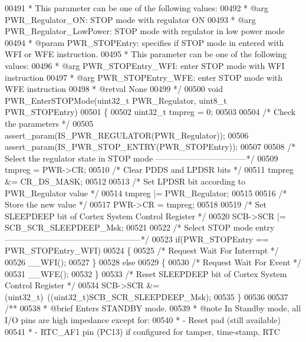 \begin{DoxyCode}
00491 \textcolor{comment}{  *          This parameter can be one of the following values:}
00492 \textcolor{comment}{  *            @arg PWR\_Regulator\_ON: STOP mode with regulator ON}
00493 \textcolor{comment}{  *            @arg PWR\_Regulator\_LowPower: STOP mode with regulator in low power mode}
00494 \textcolor{comment}{  * @param  PWR\_STOPEntry: specifies if STOP mode in entered with WFI or WFE instruction.}
00495 \textcolor{comment}{  *          This parameter can be one of the following values:}
00496 \textcolor{comment}{  *            @arg PWR\_STOPEntry\_WFI: enter STOP mode with WFI instruction}
00497 \textcolor{comment}{  *            @arg PWR\_STOPEntry\_WFE: enter STOP mode with WFE instruction}
00498 \textcolor{comment}{  * @retval None}
00499 \textcolor{comment}{  */}
00500 \textcolor{keywordtype}{void} PWR_EnterSTOPMode(uint32\_t PWR\_Regulator, uint8\_t PWR\_STOPEntry)
00501 \{
00502   uint32\_t tmpreg = 0;
00503 
00504   \textcolor{comment}{/* Check the parameters */}
00505   assert_param(IS\_PWR\_REGULATOR(PWR\_Regulator));
00506   assert_param(IS\_PWR\_STOP\_ENTRY(PWR\_STOPEntry));
00507 
00508   \textcolor{comment}{/* Select the regulator state in STOP mode ---------------------------------*/}
00509   tmpreg = PWR->CR;
00510   \textcolor{comment}{/* Clear PDDS and LPDSR bits */}
00511   tmpreg &= CR_DS_MASK;
00512 
00513   \textcolor{comment}{/* Set LPDSR bit according to PWR\_Regulator value */}
00514   tmpreg |= PWR\_Regulator;
00515 
00516   \textcolor{comment}{/* Store the new value */}
00517   PWR->CR = tmpreg;
00518 
00519   \textcolor{comment}{/* Set SLEEPDEEP bit of Cortex System Control Register */}
00520   SCB->SCR |= SCB\_SCR\_SLEEPDEEP\_Msk;
00521 
00522   \textcolor{comment}{/* Select STOP mode entry --------------------------------------------------*/}
00523   \textcolor{keywordflow}{if}(PWR\_STOPEntry == PWR_STOPEntry_WFI)
00524   \{
00525     \textcolor{comment}{/* Request Wait For Interrupt */}
00526     \_\_WFI();
00527   \}
00528   \textcolor{keywordflow}{else}
00529   \{
00530     \textcolor{comment}{/* Request Wait For Event */}
00531     \_\_WFE();
00532   \}
00533   \textcolor{comment}{/* Reset SLEEPDEEP bit of Cortex System Control Register */}
00534   SCB->SCR &= (uint32\_t)~((uint32\_t)SCB\_SCR\_SLEEPDEEP\_Msk);
00535 \}
00536 
00537 \textcolor{comment}{/**}
00538 \textcolor{comment}{  * @brief  Enters STANDBY mode.}
00539 \textcolor{comment}{  * @note   In Standby mode, all I/O pins are high impedance except for:}
00540 \textcolor{comment}{  *          - Reset pad (still available) }
00541 \textcolor{comment}{  *          - RTC\_AF1 pin (PC13) if configured for tamper, time-stamp, RTC }

\end{DoxyCode}

